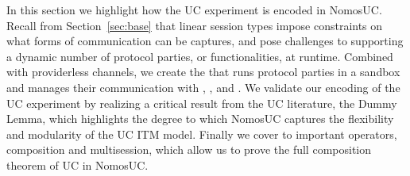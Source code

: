 In this section we highlight how the UC experiment is encoded in NomosUC.
Recall from Section~\ref{sec:base} that linear session types impose constraints on what forms of communication can be captures, and pose challenges to supporting 
a dynamic number of protocol parties, or functionalities, at runtime. 
Combined with providerless channels, we create the \partywrapper that runs protocol parties in a sandbox and manages their communication with \F, \A, and \Z.
We validate our encoding of the UC experiment by realizing a critical result from the UC literature, the Dummy Lemma, which highlights the degree to which NomosUC captures the flexibility and modularity of the UC ITM model. 
Finally we cover to important operators, composition and multisession, which allow us to prove the full composition theorem of UC in NomosUC.


